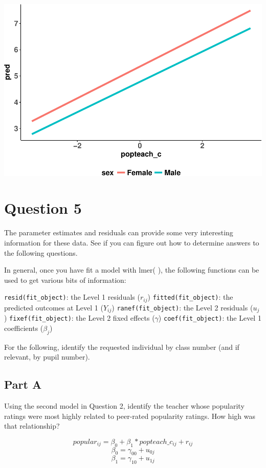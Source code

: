 \documentclass[]{article}
\begin{document}
\includegraphics{Beck_HW_3_files/figure-latex/unnamed-chunk-2-1.pdf}

\section{Question 5}\label{question-5}

The parameter estimates and residuals can provide some very interesting
information for these data. See if you can figure out how to determine
answers to the following questions.

In general, once you have fit a model with lmer( ), the following
functions can be used to get various bits of information:

\texttt{resid(fit\_object)}: the Level 1 residuals (\(r_{ij}\))
\texttt{fitted(fit\_object)}: the predicted outcomes at Level 1
(\(Y_{ij}\)) \texttt{ranef(fit\_object)}: the Level 2 residuals
(\(u_j\)) \texttt{fixef(fit\_object)}: the Level 2 fixed effects
(\(\gamma\)) \texttt{coef(fit\_object)}: the Level 1 coefficients
(\(\beta_j\))

For the following, identify the requested individual by class number
(and if relevant, by pupil number).

\subsection{Part A}\label{part-a-4}

Using the second model in Question 2, identify the teacher whose
popularity ratings were most highly related to peer-rated popularity
ratings. How high was that relationship?

\[popular_{ij} = \beta_{0} + \beta_1 * popteach\_c_{ij} + r_{ij}\]
\[\beta_0 = \gamma_{00} + u_{0j}\] \[\beta_1 = \gamma_{10} + u_{1j}\]
\end{document}

